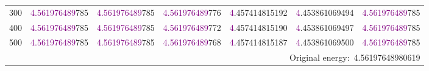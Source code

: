 \begin{table}[H]
\begin{tabular}{lllllll}
	300   &\textcolor{purple}{4.561976489}785   &\textcolor{purple}{4.561976489}785   &\textcolor{purple}{4.561976489}776   &\textcolor{purple}{4}.457414815192   &\textcolor{purple}{4}.453861069494   &\textcolor{purple}{4.561976489}785 \\
	400   &\textcolor{purple}{4.561976489}785   &\textcolor{purple}{4.561976489}785   &\textcolor{purple}{4.561976489}772   &\textcolor{purple}{4}.457414815190   &\textcolor{purple}{4}.453861069497   &\textcolor{purple}{4.561976489}785 \\
	500   &\textcolor{purple}{4.561976489}785   &\textcolor{purple}{4.561976489}785   &\textcolor{purple}{4.561976489}768   &\textcolor{purple}{4}.457414815187   &\textcolor{purple}{4}.453861069500   &\textcolor{purple}{4.561976489}785 \\
	\midrule
	  \multicolumn{7}{r}{Original energy:~4.56197648980619} \\
	  \bottomrule
	  \end{tabular}\label{tab_PAVF:1}%
  \end{table}%


